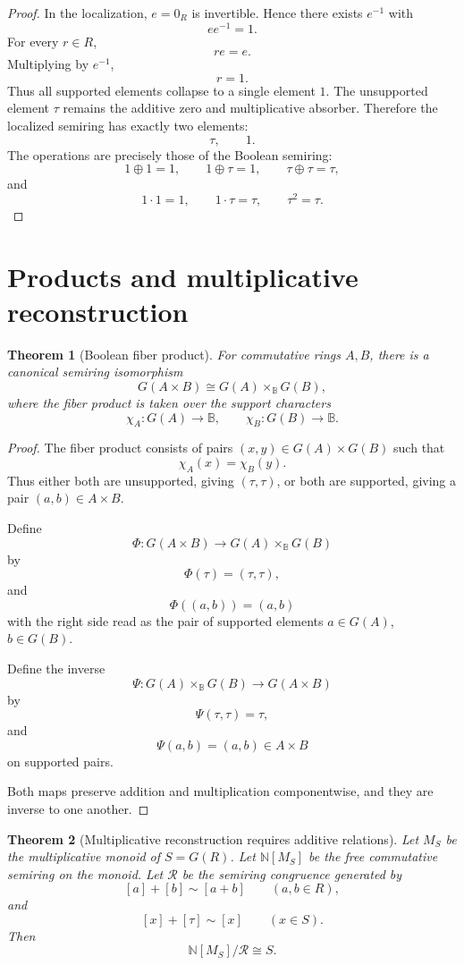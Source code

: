 \documentclass[11pt]{article}
\newtheorem{theorem}{Theorem}[section]
\newcommand{\NN}{\mathbb N}
\newcommand{\BB}{\mathbb B}
\begin{document}
\begin{proof}
In the localization, \(e=0_R\) is invertible. Hence there exists \(e^{-1}\) with
\[
ee^{-1}=1.
\]
For every \(r\in R\),
\[
re=e.
\]
Multiplying by \(e^{-1}\),
\[
r=1.
\]
Thus all supported elements collapse to a single element \(1\). The unsupported element \(\tau\) remains the additive zero and multiplicative absorber. Therefore the localized semiring has exactly two elements:
\[
\tau,\qquad 1.
\]
The operations are precisely those of the Boolean semiring:
\[
1\oplus1=1,\qquad 1\oplus\tau=1,\qquad \tau\oplus\tau=\tau,
\]
and
\[
1\cdot1=1,\qquad 1\cdot\tau=\tau,\qquad \tau^2=\tau.
\]
\end{proof}

\section{Products and multiplicative reconstruction}

\begin{theorem}[Boolean fiber product]
For commutative rings \(A,B\), there is a canonical semiring isomorphism
\[
G(A\times B)\cong G(A)\times_{\BB}G(B),
\]
where the fiber product is taken over the support characters
\[
\chi_A:G(A)\to\BB,\qquad \chi_B:G(B)\to\BB.
\]
\end{theorem}

\begin{proof}
The fiber product consists of pairs \((x,y)\in G(A)\times G(B)\) such that
\[
\chi_A(x)=\chi_B(y).
\]
Thus either both are unsupported, giving \((\tau,\tau)\), or both are supported, giving a pair \((a,b)\in A\times B\).

Define
\[
\Phi:G(A\times B)\to G(A)\times_{\BB}G(B)
\]
by
\[
\Phi(\tau)=(\tau,\tau),
\]
and
\[
\Phi((a,b))=(a,b)
\]
with the right side read as the pair of supported elements \(a\in G(A)\), \(b\in G(B)\).

Define the inverse
\[
\Psi:G(A)\times_{\BB}G(B)\to G(A\times B)
\]
by
\[
\Psi(\tau,\tau)=\tau,
\]
and
\[
\Psi(a,b)=(a,b)\in A\times B
\]
on supported pairs.

Both maps preserve addition and multiplication componentwise, and they are inverse to one another.
\end{proof}

\begin{theorem}[Multiplicative reconstruction requires additive relations]
Let \(M_S\) be the multiplicative monoid of \(S=G(R)\). Let \(\NN[M_S]\) be the free commutative semiring on the monoid. Let \(\mathcal R\) be the semiring congruence generated by
\[
[a]+[b]\sim[a+b]\qquad(a,b\in R),
\]
and
\[
[x]+[\tau]\sim[x]\qquad(x\in S).
\]
Then
\[
\NN[M_S]/\mathcal R\cong S.
\]
\end{theorem}
\end{document}
